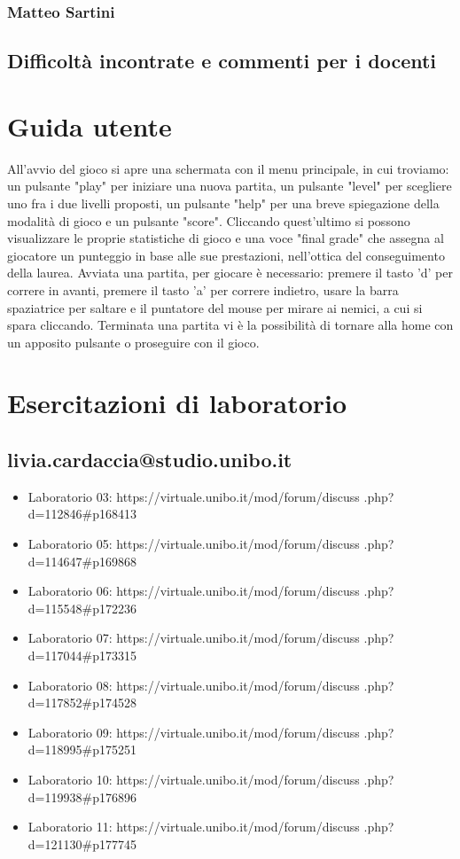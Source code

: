 \documentclass{article}
\begin{document}
\subsubsection{Matteo Sartini}
\subsection{Difficoltà incontrate e commenti per i docenti}
\section{Guida utente}
All'avvio del gioco si apre una schermata con il menu principale, in cui troviamo: un pulsante "play" per iniziare una nuova partita, un pulsante "level" per scegliere uno fra i due livelli proposti, un pulsante "help" per una breve spiegazione della modalità di gioco e un pulsante "score". 
Cliccando quest'ultimo si possono visualizzare le proprie statistiche di gioco e una voce "final grade" che assegna al giocatore un punteggio in base alle sue prestazioni, nell'ottica del conseguimento della laurea.
Avviata una partita, per giocare è necessario: premere il tasto 'd' per correre in avanti, premere il tasto 'a' per correre indietro, usare la barra spaziatrice per saltare e il puntatore del mouse per mirare ai nemici, a cui si spara cliccando.
Terminata una partita vi è la possibilità di tornare alla home con un apposito pulsante o proseguire con il gioco.
\section{Esercitazioni di laboratorio}
\subsection{livia.cardaccia@studio.unibo.it}
\begin{itemize}
    \item Laboratorio 03: https://virtuale.unibo.it/mod/forum/discuss
    .php?d=112846\#p168413
    \item Laboratorio 05: https://virtuale.unibo.it/mod/forum/discuss
    .php?d=114647\#p169868
    \item Laboratorio 06: https://virtuale.unibo.it/mod/forum/discuss
    .php?d=115548\#p172236
    \item Laboratorio 07: https://virtuale.unibo.it/mod/forum/discuss
    .php?d=117044\#p173315
    \item Laboratorio 08: https://virtuale.unibo.it/mod/forum/discuss
    .php?d=117852\#p174528
    \item Laboratorio 09: https://virtuale.unibo.it/mod/forum/discuss
    .php?d=118995\#p175251
    \item Laboratorio 10:
    https://virtuale.unibo.it/mod/forum/discuss
    .php?d=119938\#p176896
    \item Laboratorio 11: https://virtuale.unibo.it/mod/forum/discuss
    .php?d=121130\#p177745  
\end{itemize}
\end{document}

